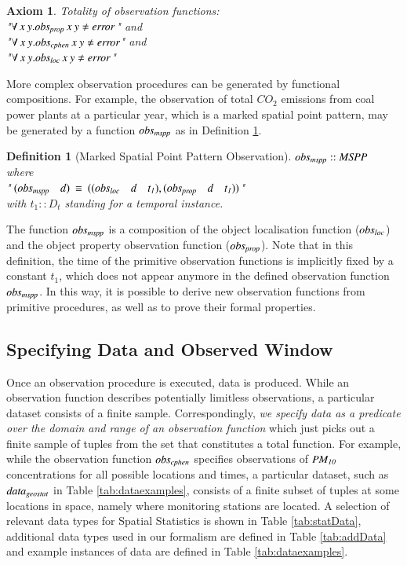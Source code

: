 \documentclass[final,authoryear,1p,times]{elsarticle}
\newtheorem{Axiom}{Axiom}
\newtheorem{definition}{Definition}
\begin{document}
\begin{Axiom}
Totality of observation functions: \\ 
"${\it \forall \:x\: y. obs_{prop}\:  x \:  y \neq error}$" and\\
"${\it\forall \:x \:y. obs_{cphen} \: x  \:y  \neq error}$" and\\
"${\it\forall \:x\: y. obs_{loc}  \:x \: y  \neq error}$"
 \label{ax:totality}
\end{Axiom}

More complex observation procedures can be generated by functional compositions. For example, the observation of total $CO_2$ emissions from coal power plants at a particular year, which is a marked spatial point pattern, may be generated by a function ${\it obs_{mspp}}$ as in Definition \ref{def:obsmspp}.

\begin{definition} [Marked Spatial Point Pattern Observation]
 ${\it obs_{mspp} :: MSPP \: }$ where \\
 "${\it \: (obs_{mspp} \quad d) \: \equiv \: ((obs_{loc} \quad d \quad t_1), (obs_{prop} \quad d \quad t_1))}$" \\ with $t_1 :: D_t$ standing for a temporal instance.
\label{def:obsmspp}
\end{definition}

The function ${\it obs_{mspp}}$ is a composition of the object localisation function (${\it obs_{loc}}$) and the object property observation function (${\it obs_{prop}}$). Note that in this definition, the time of the primitive observation functions is implicitly fixed by a constant $t_1$, which does not appear anymore in the defined observation function ${\it obs_{mspp}}$. In this way, it is possible to derive new observation functions from primitive procedures, as well as to prove their formal properties.

\subsection{Specifying Data and Observed Window}
\label{data}

Once an observation procedure is executed, data is produced. While an observation function describes potentially limitless observations, a particular dataset consists of a finite sample. Correspondingly, \textit{we specify data as a predicate over the domain and range of an observation function} which just picks out a finite sample of tuples from the set that constitutes a total function. For example, while the observation function ${\it obs_{cphen}}$ specifies observations of ${\it PM_{10}}$ concentrations for all possible locations and times, a particular dataset, such as ${\it data_{geostat}}$ in Table \ref{tab:dataexamples}, consists of a finite subset of tuples at some locations in space, namely where monitoring stations are located. A selection of relevant data types for Spatial Statistics is shown in Table \ref{tab:statData}, additional data types used in our formalism are defined in Table \ref{tab:addData} and example instances of data are defined in Table \ref{tab:dataexamples}.
\end{document}
